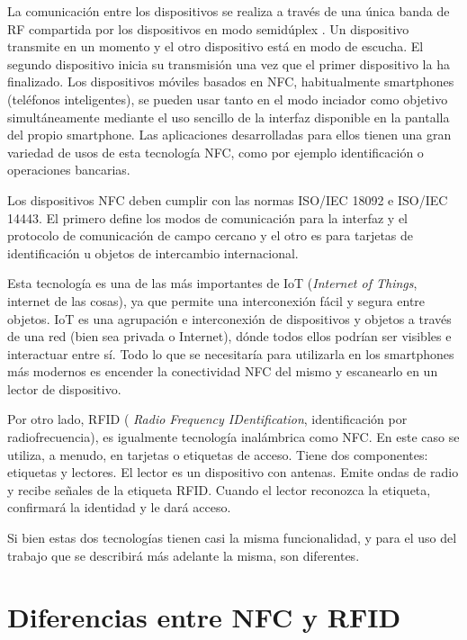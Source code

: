 \documentclass[12pt,a4paper,onecolumn,oneside]{report}
\begin{document}
La comunicación entre los dispositivos se realiza a través de una única banda de RF compartida por los dispositivos en modo semidúplex \cite{cuatro}. Un dispositivo transmite en un momento y el otro dispositivo está en modo de escucha. El segundo dispositivo inicia su transmisión una vez que el primer dispositivo la ha finalizado. Los dispositivos móviles basados en NFC, habitualmente smartphones (teléfonos inteligentes), se pueden usar tanto en el modo inciador como objetivo simultáneamente mediante el uso sencillo de la interfaz disponible en la pantalla del propio smartphone. Las aplicaciones desarrolladas para ellos tienen una gran variedad de usos de esta tecnología NFC, como por ejemplo identificación o operaciones bancarias.

Los dispositivos NFC deben cumplir con las normas ISO/IEC 18092 e ISO/IEC 14443. El primero define los modos de comunicación para la interfaz y el protocolo de comunicación de campo cercano y el otro es para tarjetas de identificación u objetos de intercambio internacional.

Esta tecnología es una de las más importantes de IoT (\textit{Internet of Things}, internet de las cosas), ya que permite una interconexión fácil y segura entre objetos. IoT es una agrupación e interconexión de dispositivos y objetos a través de una red (bien sea privada o Internet), dónde todos ellos podrían ser visibles e interactuar entre sí. Todo lo que se necesitaría para utilizarla en los smartphones más modernos es encender la conectividad NFC del mismo y escanearlo en un lector de dispositivo.

Por otro lado, RFID (\textit{ Radio Frequency IDentification}, identificación por radiofrecuencia), es igualmente tecnología inalámbrica como NFC. En este caso se utiliza, a menudo, en tarjetas o etiquetas de acceso. Tiene dos componentes: etiquetas y lectores. El lector es un dispositivo con antenas. Emite ondas de radio y recibe señales de la etiqueta RFID. Cuando el lector reconozca la etiqueta, confirmará la identidad y le dará acceso. 

Si bien estas dos tecnologías tienen casi la misma funcionalidad, y para el uso del trabajo que se describirá más adelante la misma, son diferentes. 


\section{Diferencias entre NFC y RFID}
\label{Diferencias entre NFC y RFID}
\end{document}
